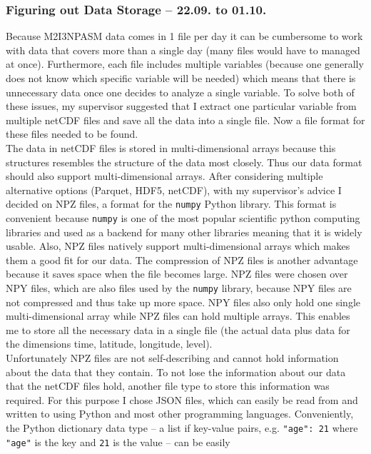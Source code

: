 \documentclass[../00_main.tex]{subfiles}
\begin{document}
\subsubsection{Figuring out Data Storage -- 22.09. to 01.10.}

Because M2I3NPASM data comes in 1 file per day it can be cumbersome to work
with data that covers more than a single day (many files would have to managed
at once). Furthermore, each file includes multiple variables (because one
generally does not know which specific variable will be needed) which means
that there is unnecessary data once one decides to analyze a single variable.
To solve both of these issues, my supervisor suggested that I extract one
particular variable from multiple netCDF files and save all the data into
a single file. Now a file format for these files needed to be found.\\
The data in netCDF files is stored in multi-dimensional arrays because this
structures resembles the structure of the data most closely. Thus our data
format should also support multi-dimensional arrays. After
considering multiple alternative options (Parquet, HDF5, netCDF), with my
supervisor's advice I decided on NPZ files, a format for the \texttt{numpy} 
Python library. This format is convenient because \texttt{numpy} is one of the 
most popular scientific python computing libraries and used as a backend for 
many other libraries meaning that it is widely usable. Also, NPZ files natively
support multi-dimensional arrays which makes them a good fit for our data. 
The compression of NPZ files is another advantage because it saves space when 
the file becomes large. NPZ files were chosen over NPY files, which are also 
files used by the \texttt{numpy} library, because NPY files are not compressed 
and thus take up more space. NPY files also only hold one single
multi-dimensional array while NPZ files can hold multiple arrays. This enables
me to store all the necessary data in a single file (the actual data plus data
for the dimensions time, latitude, longitude, level).\\
Unfortunately NPZ files are not self-describing and cannot hold information
about the data that they contain. To not lose the information about our data
that the netCDF files hold, another file type to store this information was
required. For this purpose I chose JSON files, which can easily be read from
and written to using Python and most other programming languages. Conveniently,
the Python dictionary data type -- a list if key-value pairs, e.g. \texttt{"age":
21} where \texttt{"age"} is the key and \texttt{21} is the value -- can be easily
\end{document}
